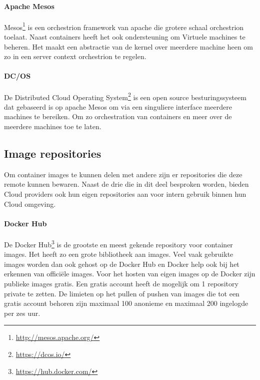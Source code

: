 \paragraph{Apache Mesos}
Mesos\footnote{\url{http://mesos.apache.org/}} is een orchestrion framework van apache die grotere schaal orchestrion toelaat. Naast containers heeft het ook ondersteuning om Virtuele machines te beheren. Het maakt een abstractie van de kernel over meerdere machine heen om zo in een server context orchestrion te regelen.
\paragraph{DC/OS}
De Distributed Cloud Operating System\footnote{\url{https://dcos.io/}} is een open source besturingssysteem dat gebaseerd is op apache Mesos om via een singuliere interface meerdere machines te bereiken. Om zo orchestration van containers en meer over de meerdere machines toe te laten.
\subsection{Image repositories}
Om container images te kunnen delen met andere zijn er repositories die deze remote kunnen bewaren. Naast de drie die in dit deel besproken worden, bieden Cloud providers ook hun eigen repositories aan voor intern gebruik binnen hun Cloud omgeving.
\paragraph{Docker Hub}
De Docker Hub\footnote{\url{https://hub.docker.com/}} is de grootste en meest gekende repository voor container images. Het heeft zo een grote bibliotheek aan images. Veel vaak gebruikte images worden dan ook gehost op de Docker Hub en Docker help ook bij het erkennen van officiële images. Voor het hosten van eigen images op de Docker zijn publieke images gratis. Een gratis account heeft de mogelijk om 1 repository private te zetten. De limieten op het pullen of pushen van images die tot een gratis account behoren zijn maximaal 100 anonieme en maximaal 200 ingelogde per zes uur. 
